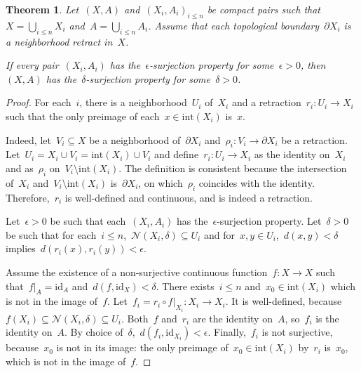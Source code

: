\documentclass[english,11pt]{article}
\theoremstyle{plain}
\newtheorem{theorem}{Theorem}[section]
\theoremstyle{remark}
\theoremstyle{definition}
\newcommand{\id}{\mathrm{id}}
\renewcommand{\int}[1]{\mathrm{int}(#1)}
\newcommand{\Ne}{\mathcal{N}}
\begin{document}
\begin{theorem}\label{thm_finite_union}
Let~$(X,A)$ and~$(X_i,A_i)_{i\leq n}$ be compact pairs such that~$X=\bigcup_{i\leq n}X_i$ and~$A=\bigcup_{i\leq n}A_i$. Assume that each topological boundary~$\partial X_i$ is a neighborhood retract in~$X$.

If every pair~$(X_i,A_i)$ has the~$\epsilon$-surjection property for some~$\epsilon>0$, then~$(X,A)$ has the~$\delta$-surjection property for some~$\delta>0$.
\end{theorem}
\begin{proof}
For each~$i$, there is a neighborhood~$U_i$ of~$X_i$ and a retraction~$r_i:U_i\to X_i$ such that the only preimage of each~$x\in \int{X_i}$ is~$x$.

Indeed, let~$V_i\subseteq X$ be a neighborhood of~$\partial X_i$ and~$\rho_i:V_i\to\partial X_i$ be a retraction. Let~$U_i=X_i\cup V_i=\int{X_i}\cup V_i$ and define~$r_i:U_i\to X_i$ as the identity on~$X_i$ and as~$\rho_i$ on~$V_i\setminus \int{X_i}$. The definition is consistent because the intersection of~$X_i$ and~$V_i\setminus \int{X_i}$ is~$\partial X_i$, on which~$\rho_i$ coincides with the identity. Therefore,~$r_i$ is well-defined and continuous, and is indeed a retraction.

Let~$\epsilon>0$ be such that each~$(X_i,A_i)$ has the~$\epsilon$-surjection property. Let~$\delta>0$ be such that for each~$i\leq n$,~$\Ne(X_i,\delta)\subseteq U_i$ and for~$x,y\in U_i$,~$d(x,y)<\delta$ implies~$d(r_i(x),r_i(y))<\epsilon$.

Assume the existence of a non-surjective continuous function~$f:X\to X$ such that~$f|_A=\id_A$ and~$d(f,\id_X)<\delta$. There exists~$i\leq n$ and~$x_0\in \int{X_i}$ which is not in the image of~$f$. Let~$f_i=r_i\circ f|_{X_i}:X_i\to X_i$. It is well-defined, because~$f(X_i)\subseteq \Ne(X_i,\delta)\subseteq U_i$. Both~$f$ and~$r_i$ are the identity on~$A$, so~$f_i$ is the identity on~$A$. By choice of~$\delta$,~$d(f_i,\id_{X_i})<\epsilon$. Finally,~$f_i$ is not surjective, because~$x_0$ is not in its image: the only preimage of~$x_0\in\int{X_i}$ by~$r_i$ is~$x_0$, which is not in the image of~$f$.
\end{proof}
%
\end{document}
